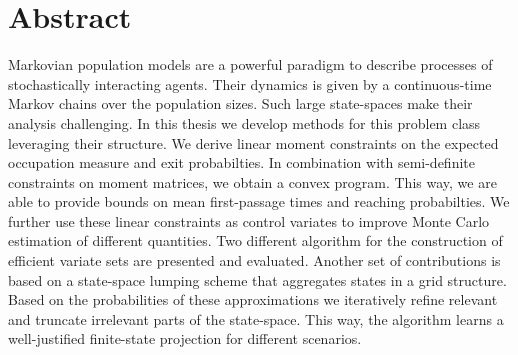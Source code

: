 
\chapter*{Abstract}
Markovian population models are a powerful paradigm to describe processes of stochastically interacting agents. Their dynamics is given by a continuous-time Markov chains over the population sizes. Such large state-spaces make their analysis challenging.
In this thesis we develop methods for this problem class leveraging their structure. We derive linear moment constraints on the expected occupation measure and exit probabilties. In combination with semi-definite constraints on moment matrices, we obtain a convex program. This way, we are able to provide bounds on mean first-passage times and reaching probabilties. We further use these linear constraints as control variates to improve Monte Carlo estimation of different quantities. Two different algorithm for the construction of efficient variate sets are presented and evaluated.
Another set of contributions is based on a state-space lumping scheme that aggregates states in a grid structure. Based on the probabilities of these approximations we iteratively refine relevant and truncate irrelevant parts of the state-space. This way, the algorithm learns a well-justified finite-state projection for different scenarios.

\cleardoublepage

